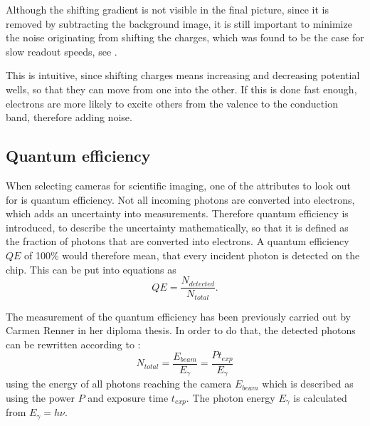 Although the shifting gradient is not visible in the final picture, since it is removed by subtracting the background image, it is still important to minimize the noise originating from shifting the charges, which was found to be the case for slow readout speeds, see .


This is intuitive, since shifting charges means increasing and decreasing potential wells, so that they can move from one into the other. If this is done fast enough, electrons are more likely to excite others from the valence to the conduction band, therefore adding noise.

\newpage
\subsection{Quantum efficiency}
When selecting cameras for scientific imaging, one of the attributes to look out for is quantum efficiency. Not all incoming photons are converted into electrons, which adds an uncertainty into measurements. Therefore quantum efficiency is introduced, to describe the uncertainty mathematically, so that it is defined as the fraction of photons that are converted into electrons. A quantum efficiency $QE$ of 100\% would therefore mean, that every incident photon is detected on the chip. This can be put into equations as
\begin{equation}
QE = \frac{N_{detected}}{N_{total}}.
\end{equation}

The measurement of the quantum efficiency has been previously carried out by Carmen Renner  in her diploma thesis. In order to do that, the detected photons can be rewritten according to :
\begin{equation}
N_{total} = \frac{E_{beam}}{E_\gamma} = \frac{P t_{exp}}{E_\gamma}
\end{equation}
using the energy of all photons reaching the camera $E_{beam}$ which is described as using the power $P$ and exposure time $t_{exp}$. The photon energy $E_\gamma$ is calculated from $E_\gamma= h\nu$.

